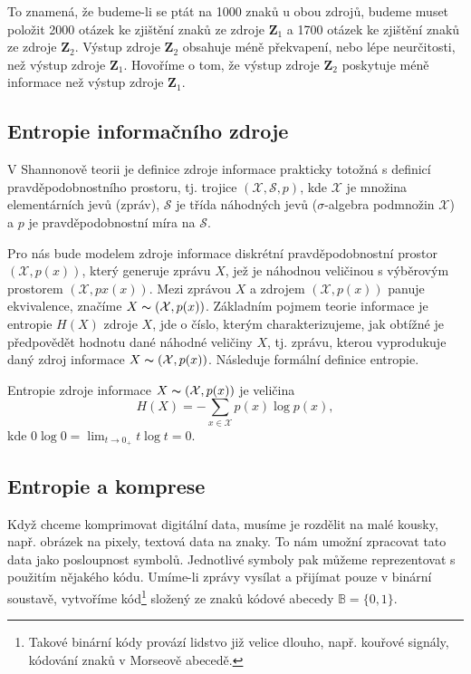 To znamená, že budeme-li se ptát na 1000 znaků u obou zdrojů, budeme muset položit 2000 otázek ke zjištění znaků ze zdroje $\mathbf{Z}_1$ a 1700 otázek ke zjištění znaků ze zdroje $\mathbf{Z}_2$. Výstup zdroje $\mathbf{Z}_2$ obsahuje méně překvapení, nebo lépe neurčitosti, než výstup zdroje $\mathbf{Z}_1$. Hovoříme o tom, že výstup zdroje $\mathbf{Z}_2$ poskytuje méně informace než výstup zdroje $\mathbf{Z}_1$.

\subsection{Entropie informačního zdroje}
V Shannonově teorii je definice zdroje informace prakticky totožná s definicí pravdě\-po\-do\-bno\-stní\-ho prostoru, tj. trojice $(\mathcal{X},\mathcal{S},p)$, kde $\mathcal{X}$ je množina elementárních jevů (zpráv), $\mathcal{S}$ je třída náhodných jevů ($\sigma$-algebra podmnožin $\mathcal{X}$) a $p$ je pravděpodobnostní míra na $\mathcal{S}$. \cite{teorieInformace}

Pro nás bude modelem zdroje informace diskrétní pravděpodobnostní prostor $(\mathcal{X},p(x))$, který generuje zprávu $X$, jež je náhodnou veličinou s výběrovým prostorem $(\mathcal{X}, px(x))$. Mezi zprávou $X$ a zdrojem $(\mathcal{X}, p(x))$ panuje ekvivalence, značíme $X \thicksim (\mathcal{X}, p(x))$. Základním pojmem teorie informace je entropie $H(X)$ zdroje $X$, jde o číslo, kterým charakterizujeme, jak obtížné je předpovědět hodnotu dané náhodné veličiny $X$, tj. zprávu, kterou vyprodukuje daný zdroj informace $X \thicksim (\mathcal{X}, p(x))$. Následuje formální definice entropie. \cite{teorieInformace}

\begin{defi}
Entropie zdroje informace $X \thicksim (\mathcal{X}, p(x))$ je veličina $$H(X) = -\sum_{x \in \mathcal{X}} p(x)\log p(x),$$ kde $0 \log 0 = \lim_{t \to 0_+} t \log t = 0$.
\end{defi}

\subsection{Entropie a komprese}
Když chceme komprimovat digitální data, musíme je rozdělit na malé kousky, např. obrázek na pixely, textová data na znaky. To nám umožní zpracovat tato data jako posloupnost symbolů. Jednotlivé symboly pak můžeme reprezentovat s použitím nějakého kódu. Umíme-li zprávy vysílat a přijímat pouze v binární soustavě, vytvoříme kód\footnote{Takové binární kódy provází lidstvo již velice dlouho, např. kouřové signály, kódování znaků v Morseově abecedě.} složený ze znaků kódové abecedy $\mathbb{B} = \{0,1\}$.

